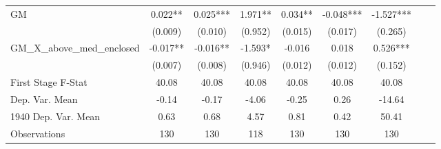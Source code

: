 \begin{tabular}{l*{8}{c}}
\cmidrule(lr){1-7}
GM              &    0.022** &    0.025***&    1.971** &    0.034** &   -0.048***&   -1.527***\\
                &  (0.009)   &  (0.010)   &  (0.952)   &  (0.015)   &  (0.017)   &  (0.265)   \\
\addlinespace
GM\_X\_above\_med\_enclosed&   -0.017** &   -0.016** &   -1.593*  &   -0.016   &    0.018   &    0.526***\\
                &  (0.007)   &  (0.008)   &  (0.946)   &  (0.012)   &  (0.012)   &  (0.152)   \\
\midrule
First Stage F-Stat&    40.08   &    40.08   &    40.08   &    40.08   &    40.08   &    40.08   \\
Dep. Var. Mean  &    -0.14   &    -0.17   &    -4.06   &    -0.25   &     0.26   &   -14.64   \\
1940 Dep. Var. Mean&     0.63   &     0.68   &     4.57   &     0.81   &     0.42   &    50.41   \\
Observations    &      130   &      130   &      118   &      130   &      130   &      130   \\
 \bottomrule \end{tabular}
